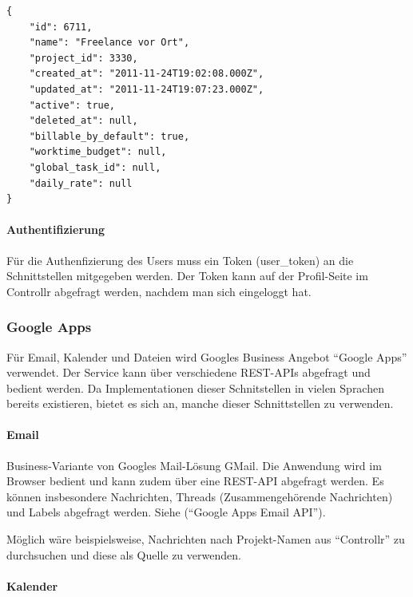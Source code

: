 \documentclass[]{article}
\begin{document}
\begin{lstlisting}[caption=Schema von /api/tasks, label=lstcontrollrTasksResult]
{
    "id": 6711,
    "name": "Freelance vor Ort",
    "project_id": 3330,
    "created_at": "2011-11-24T19:02:08.000Z",
    "updated_at": "2011-11-24T19:07:23.000Z",
    "active": true,
    "deleted_at": null,
    "billable_by_default": true,
    "worktime_budget": null,
    "global_task_id": null,
    "daily_rate": null
}
\end{lstlisting}

\paragraph{Authentifizierung}\label{authentifizierung}

Für die Authenfizierung des Users muss ein Token (user\_token) an die
Schnittstellen mitgegeben werden. Der Token kann auf der Profil-Seite im
Controllr abgefragt werden, nachdem man sich eingeloggt hat.

\subsubsection{Google Apps}\label{google-apps}

Für Email, Kalender und Dateien wird Googles Business Angebot ``Google
Apps'' verwendet. Der Service kann über verschiedene REST-APIs abgefragt
und bedient werden. Da Implementationen dieser Schnitstellen in vielen
Sprachen bereits existieren, bietet es sich an, manche dieser
Schnittstellen zu verwenden.

\paragraph{Email}\label{email}

Business-Variante von Googles Mail-Lösung GMail. Die Anwendung wird im
Browser bedient und kann zudem über eine REST-API abgefragt werden. Es
können insbesondere Nachrichten, Threads (Zusammengehörende Nachrichten)
und Labels abgefragt werden. Siehe (``Google Apps Email API'').

Möglich wäre beispielsweise, Nachrichten nach Projekt-Namen aus
``Controllr'' zu durchsuchen und diese als Quelle zu verwenden.

\paragraph{Kalender}\label{kalender}
\end{document}
